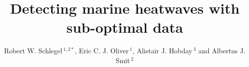 \documentclass[utf8]{frontiersSCNS} %
\def\firstAuthorLast{Schlegel {et~al.}} %
\def\Authors{Robert W. Schlegel\,$^{1,2*}$, Eric C. J. Oliver\,$^{1}$, Alistair J. Hobday\,$^{3}$ and Albertus J. Smit\,$^{2}$}
\begin{document}
\onecolumn
{}

\title[Detecting marine heatwaves]{Detecting marine heatwaves with sub-optimal data}

\author[\firstAuthorLast ]{\Authors} %
\address{} %
\correspondance{} %

\extraAuth{}%


\maketitle
\end{document}
